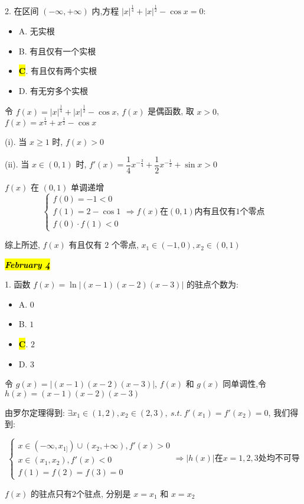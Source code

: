 2. 在区间 $(-\infty,+\infty)$ 内,方程 $|x|^{\frac{1}{4}}+|x|^{\frac{1}{2}}-\cos x=0$: 
\begin{itemize}
	\item A. 无实根
	\item B. 有且仅有一个实根
	\item \hl{\textbf{C}}. 有且仅有两个实根
	\item D. 有无穷多个实根
\end{itemize}
\begin{solution}

	令 $f(x) = |x|^{\frac{1}{4}}+|x|^{\frac{1}{2}}-\cos x$, $f(x)$ 是偶函数, 取 $x > 0$, $f(x) = x^{\frac{1}{4}}+x^{\frac{1}{2}}-\cos x$

	(i). 当 $x \geq 1$ 时, $f(x) > 0$

	(ii). 当 $x\in (0,1)$ 时, $f'(x) = \dfrac{1}{4}x^{-\frac{3}{4}}+\dfrac{1}{2}x^{-\frac{1}{2}}+\sin x > 0$
	
	$f(x)$ 在 $(0,1)$ 单调递增
	$$\begin{cases}f(0) = -1<0\\f(1)=2-\cos 1\\ f(0)\cdot f(1)<0 \end{cases}\Rightarrow f(x)\text{在}(0,1) \text{内有且仅有} 1 \text{个零点}$$

	综上所述, $f(x)$ 有且仅有 $2$ 个零点, $x_{1}\in(-1,0),x_{2}\in(0,1)$
\end{solution}

\hl{\textbf{\textit{February 4}}}

1. 函数 $f(x)=\ln|(x-1)(x-2)(x-3)|$ 的驻点个数为:
\begin{itemize}
	\item A. $0$
	\item B. $1$
	\item \hl{\textbf{C}}. $2$
	\item D. $3$
\end{itemize}
\begin{solution}

	令 $g(x) =|(x-1)(x-2)(x-3)|$, $f(x)$ 和 $g(x)$ 同单调性,令 $h(x) = (x-1)(x-2)(x-3)$

	由罗尔定理得到: $\exists x_{1}\in(1,2), x_{2}\in (2,3),\ s.t.\ f'(x_{1}) =f'(x_{2}) =0$, 我们得到:

	$$\begin{cases}
	x\in(-\infty,x_{1]})\cup (x_{2},+\infty), f'(x) > 0\\
	x\in(x_{1}, x_{2}), f'(x) < 0\\
	f(1) =f(2) =f(3) =0
	\end{cases}\Rightarrow |h(x)|\text{在} x=1,2,3\text{处均不可导}$$

	$f(x)$ 的驻点只有$2$个驻点, 分别是 $x=x_{1}$ 和 $x=x_{2}$ 
\end{solution}

